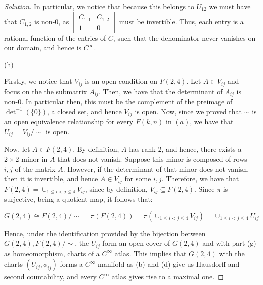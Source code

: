 \documentclass[10pt]{article}
\begin{document}
\begin{proof}[Solution]
In particular, we notice that because this belongs to $U_{12}$ we must have that $C_{1,2}$ is non-0, as $\begin{bmatrix} C_{1,1} & C_{1,2} \\ 1 & 0 \end{bmatrix}$ must be invertible. Thus, each entry is a rational function of the entries of $C$, such that the denominator never vanishes on our domain, and hence is $C^\infty$.

(h)

Firstly, we notice that $V_{ij}$ is an open condition on $F(2,4)$. Let $A \in V_{ij}$ and focus on the the submatrix $A_{ij}$. Then, we have that the determinant of $A_{ij}$ is non-0. In particular then, this must be the complement of the preimage of $\det^{-1}(\{ 0 \})$, a closed set, and hence $V_{ij}$ is open. Now, since we proved that $\sim$ is an open equivalence relationship for every $F(k,n)$ in $(a)$, we have that $U_{ij} = V_{ij} / \sim$ is open.

Now, let $A \in F(2,4)$. By definition, $A$ has rank 2, and hence, there exists a $2 \times 2$ minor in $A$ that does not vanish. Suppose this minor is composed of rows $i, j$ of the matrix $A$. However, if the determinant of that minor does not vanish, then it is invertible, and hence $A \in V_{ij}$ for some $i,j$. Therefore, we have that $F(2,4) = \cup_{1 \leq i < j \leq 4} V_{ij}$, since by definition, $V_{ij} \subseteq F(2,4)$. Since $\pi$ is surjective, being a quotient map, it follows that:

$$G(2,4) \cong F(2,4)/\sim = \pi(F(2,4)) = \pi(\cup_{1 \leq i < j \leq 4} V_{ij}) = \cup_{1 \leq i < j \leq 4} U_{ij}$$

Hence, under the identification provided by the bijection between $G(2,4), F(2,4)/\sim$, the $U_{ij}$ form an open cover of $G(2,4)$ and with part (g) as homeomorphism, charts of a $C^\infty$ atlas. This implies that $G(2,4)$ with the charts $(U_{ij}, \phi_{ij})$ forms a $C^\infty$ manifold as (b) and (d) give us Hausdorff and second countability, and every $C^\infty$ atlas gives rise to a maximal one.

\end{proof}
\end{document}
